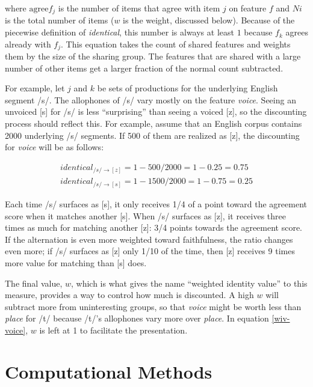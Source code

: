 \documentclass[11pt]{article}
\begin{document}
  \noindent{}where $\textrm{agree}f_{j}$ is the number of items that agree
  with item $j$ on feature $f$ and $Ni$ is the total number of
  items ($w$ is the weight, discussed below). Because of the
  piecewise definition of \textit{identical}, this number is always at
  least $1$ because $f_k$ agrees already with $f_j$.
  This equation takes the count of shared features and weights
  them by the size of the sharing group. The features that are shared
  with a large number of other items get a larger fraction of the normal
  count subtracted.

  For example, let $j$ and $k$ be sets of productions for the
  underlying English segment /s/. The allophones of /s/ vary mostly on the feature
  \textit{voice}. Seeing an unvoiced [s] for /s/ is less ``surprising'' than
  seeing a voiced [z], so the discounting process should
  reflect this. For example, assume that an English corpus contains 2000
  underlying /s/ segments. If 500 of them are realized as [z], the
  discounting for \textit{voice} will be as follows:

  \begin{equation}
    \begin{array}{c}
      identical_{/s/\to[z]} = 1 - 500/2000 = 1 - 0.25 = 0.75 \\
      identical_{/s/\to[s]} = 1 - 1500/2000 = 1 - 0.75 = 0.25
    \end{array}
    \label{wiv-voice}
  \end{equation}

  Each time /s/ surfaces as [s], it only receives 1/4 of a point
  toward the agreement score when it matches another [s]. When /s/
  surfaces as [z], it receives three times as much for matching
  another [z]: 3/4 points towards the agreement score. If the
  alternation is even more weighted toward faithfulness, the ratio
  changes even more; if /s/ surfaces as [z] only 1/10 of the time,
  then [z] receives 9 times more value for matching than [s] does.

  The final value, $w$, which is what gives the name ``weighted
  identity value'' to this measure, provides a way to control how much
  is discounted. A high $w$ will subtract more from uninteresting
  groups, so that \textit{voice} might be worth less than
  \textit{place} for /t/ because /t/'s allophones vary more over
  \textit{place}. In equation \ref{wiv-voice}, $w$ is left at 1 to
  facilitate the presentation.

\section{Computational Methods}
\end{document}
